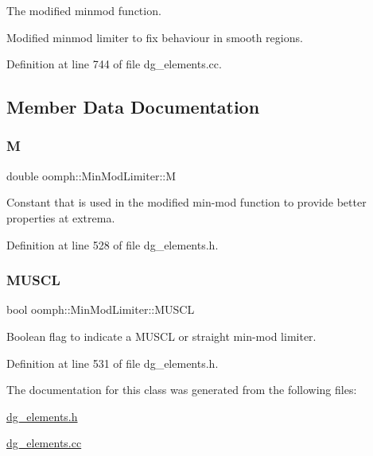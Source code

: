 The modified minmod function. 

Modified minmod limiter to fix behaviour in smooth regions. 

Definition at line 744 of file dg\+\_\+elements.\+cc.



\subsection{Member Data Documentation}
\mbox{\label{classoomph_1_1MinModLimiter_afd69a0c54eda8f4489c578faf51156bc}} 
\subsubsection{\texorpdfstring{M}{M}}
{\footnotesize\ttfamily double oomph\+::\+Min\+Mod\+Limiter\+::M\hspace{0.3cm}{\ttfamily [private]}}



Constant that is used in the modified min-\/mod function to provide better properties at extrema. 



Definition at line 528 of file dg\+\_\+elements.\+h.

\mbox{\label{classoomph_1_1MinModLimiter_a44288d5262b23de81e093bdb62b1a889}} 
\subsubsection{\texorpdfstring{M\+U\+S\+CL}{MUSCL}}
{\footnotesize\ttfamily bool oomph\+::\+Min\+Mod\+Limiter\+::\+M\+U\+S\+CL\hspace{0.3cm}{\ttfamily [private]}}



Boolean flag to indicate a M\+U\+S\+CL or straight min-\/mod limiter. 



Definition at line 531 of file dg\+\_\+elements.\+h.



The documentation for this class was generated from the following files\+:\begin{DoxyCompactItemize}
\item 
\hyperlink{dg__elements_8h}{dg\+\_\+elements.\+h}\item 
\hyperlink{dg__elements_8cc}{dg\+\_\+elements.\+cc}\end{DoxyCompactItemize}
